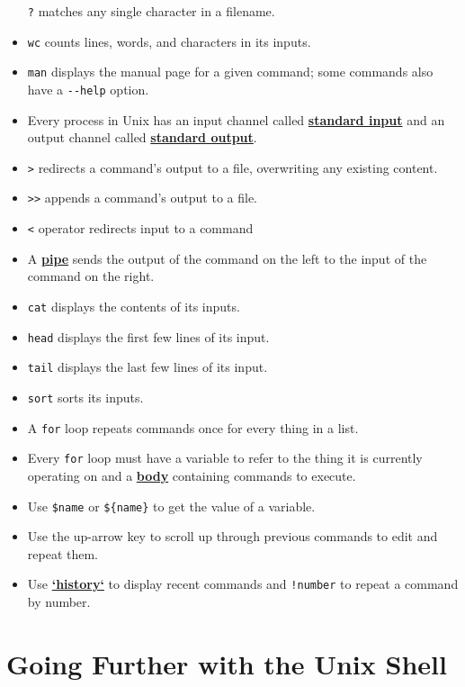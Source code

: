 \documentclass[
]{krantz}
\newcommand{\gref}[2]{\hyperlink{#2}{\textbf{#1}}}
\begin{document}
\begin{itemize}
  \texttt{?} matches any single character in a filename.
\item
  \texttt{wc} counts lines, words, and characters in its inputs.
\item
  \texttt{man} displays the manual page for a given command; some commands also have a \texttt{-\/-help} option.
\item
  Every process in Unix has an input channel called \gref{standard input}{stdin}
  and an output channel called \gref{standard output}{stdin}.
\item
  \texttt{\textgreater{}} redirects a command's output to a file, overwriting any existing content.
\item
  \texttt{\textgreater{}\textgreater{}} appends a command's output to a file.
\item
  \texttt{\textless{}} operator redirects input to a command
\item
  A \gref{pipe}{pipe\_shell} \texttt{\textbar{}} sends the output of the command on the left to the input of the command on the right.
\item
  \texttt{cat} displays the contents of its inputs.
\item
  \texttt{head} displays the first few lines of its input.
\item
  \texttt{tail} displays the last few lines of its input.
\item
  \texttt{sort} sorts its inputs.
\item
  A \texttt{for} loop repeats commands once for every thing in a list.
\item
  Every \texttt{for} loop must have a variable to refer to the thing it is currently operating on
  and a \gref{body}{loop\_body} containing commands to execute.
\item
  Use \texttt{\$name} or \texttt{\$\{name\}} to get the value of a variable.
\item
  Use the up-arrow key to scroll up through previous commands to edit and repeat them.
\item
  Use \gref{`history`}{command\_history} to display recent commands and \texttt{!number} to repeat a command by number.
\end{itemize}

\hypertarget{going-further-with-the-unix-shell-1}{%
\section{Going Further with the Unix Shell}\label{going-further-with-the-unix-shell-1}}
\end{document}
